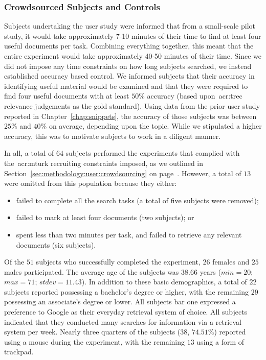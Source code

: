 \subsubsection{Crowdsourced Subjects and Controls}
Subjects undertaking the user study were informed that from a small-scale pilot study, it would take approximately 7-10 minutes of their time to find at least four useful documents per task. Combining everything together, this meant that the entire experiment would take approximately 40-50 minutes of their time. Since we did not impose any time constraints on how long subjects searched, we instead established accuracy based control. We informed subjects that their accuracy in identifying useful material would be examined and that they were required to find four useful documents with at least $50\%$ accuracy (based upon~\gls{acr:trec} relevance judgements as the gold standard). Using data from the prior user study reported in Chapter~\ref{chap:snippets}, the accuracy of those subjects was between $25\%$ and $40\%$ on average, depending upon the topic. While we stipulated a higher accuracy, this was to motivate subjects to work in a diligent manner.

In all, a total of $64$ subjects performed the experiments that complied with the~\gls{acr:mturk} recruiting constraints imposed, as we outlined in Section~\ref{sec:methodology:user:crowdsourcing} on page~\pageref{sec:methodology:user:crowdsourcing}. However, a total of $13$ were omitted from this population because they either:

\begin{itemize}
    \item{failed to complete all the search tasks (a total of five subjects were removed);}
    \item{failed to mark at least four documents (two subjects); or}
    \item{spent less than two minutes per task, and failed to retrieve any relevant documents (six subjects).}
\end{itemize}

Of the $51$ subjects who successfully completed the experiment, $26$ females and $25$ males participated. The average age of the subjects was $38.66$ years ($min=20$; $max=71$; $stdev=11.43$). In addition to these basic demographics, a total of $22$ subjects reported possessing a bachelor's degree or higher, with the remaining $29$ possessing an associate's degree or lower. All subjects bar one expressed a preference to Google as their everyday retrieval system of choice. All subjects indicated that they conducted many searches for information via a retrieval system per week. Nearly three quarters of the subjects ($38$, $74.51\%$) reported using a mouse during the experiment, with the remaining $13$ using a form of trackpad.

